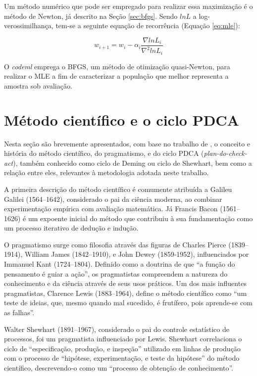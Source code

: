 \documentclass[cic,tc]{iiufrgs}
\begin{document}

Um método numérico que pode ser empregado para realizar essa maximização é o
método de Newton, já descrito na Seção \ref{sec:bfgs}. Sendo $lnL$ a
log-verossimilhança, tem-se a seguinte equação de recorrência (Equação
\ref{eq:mle}):

\begin{equation}
\label{eq:mle}
w_{i+1} = w_i - \alpha_i \frac{\nabla lnL_i}{\nabla^2 lnL_i}
\end{equation}

O \textit{codeml} emprega o BFGS, um método de otimização quasi-Newton, para
realizar o MLE a fim de caracterizar a população que melhor representa a
amostra sob avaliação.


\section{Método científico e o ciclo PDCA}
\label{sec:pdca}

Nesta seção são brevemente apresentados, com base no trabalho de
\cite{moen2006evolution}, o conceito e história do método científico, do
pragmatismo, e do ciclo PDCA (\textit{plan-do-check-act}), também conhecido
como ciclo de Deming ou ciclo de Shewhart, bem como a relação entre eles,
relevantes à metodologia adotada neste trabalho.

A primeira descrição do método científico é comumente atribuída a Galileu
Galilei (1564--1642), considerado o pai da ciência moderna, ao combinar
experimentação empírica com avaliação matemática. Já Francis Bacon (1561--1626)
é um expoente inicial do método que contribuiu à sua fundamentação como um
processo iterativo de dedução e indução.

O pragmatismo surge como filosofia através das figuras de Charles Pierce
(1839--1914), William James (1842--1910), e John Dewey (1859-1952),
influenciados por Immanuel Kant (1724--1804). Definido como a doutrina de que
``a função do pensamento é guiar a ação'', os pragmatistas compreendem a
natureza do conhecimento e da ciência através de seus usos práticos. Um dos
mais influentes pragmatistas, Clarence Lewis (1883--1964), define o método
científico como ``um teste de ideias, que, mesmo quando mal sucedido, é
frutífero, pois aprende-se com as falhas''.

Walter Shewhart (1891--1967), considerado o pai do controle estatístico de
processos, foi um pragmatista influenciado por Lewis. Shewhart correlaciona o
ciclo de ``especificação, produção, e inspeção'' utilizado em linhas de
produção com o processo de ``hipótese, experimentação, e teste da hipótese'' do
método científico, descrevendo-o como um ``processo de obtenção de
conhecimento''.
\end{document}
